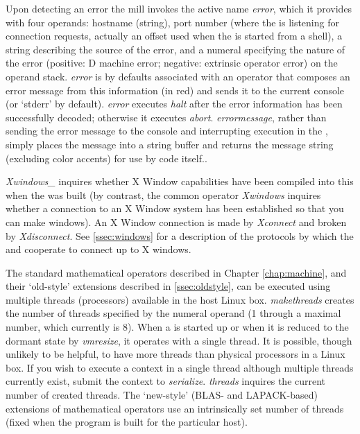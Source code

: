 Upon detecting an error the  mill invokes the active name \emph{error}, which it provides with four operands: hostname (string), port number (where the  is listening for connection requests, actually an offset used when the  is started from a shell), a string describing the source of the error, and a numeral specifying the nature of the error (positive: D machine error; negative: extrinsic operator error) on the operand stack. \emph{error} is by defaults associated with an operator that composes an error message from this information (in red) and sends it to the current console (or `stderr' by default). \emph{error} executes \emph{halt} after the error information has been successfully decoded; otherwise it executes \emph{abort}. \emph{errormessage}, rather than sending the error message to the console and interrupting execution in the , simply places the message into a string buffer and returns the message string (excluding color accents) for use by  code itself..

\emph{Xwindows\_} inquires whether X Window capabilities have been compiled into this  when the  was built (by contrast, the common operator \emph{Xwindows} inquires whether a connection to an X Window system has been established so that you can make windows). An X Window connection is made by \emph{Xconnect} and broken by \emph{Xdisconnect}. See \ref{ssec:windows} for a description of the protocols by which the  and  cooperate to connect up to X windows.

The standard mathematical operators described in Chapter \ref{chap:machine}, and their `old-style' extensions described in \ref{ssec:oldstyle}, can be executed using multiple threads (processors) available in the host Linux box. \emph{makethreads} creates the number of threads specified by the numeral operand (1 through a maximal number, which currently is 8). When a  is started up or when it is reduced to the dormant state by \emph{vmresize}, it operates with a single thread. It is possible, though unlikely to be helpful, to have more threads than physical processors in a Linux box. If you wish to execute a context in a single thread although multiple threads currently exist, submit the context to \emph{serialize}. \emph{threads} inquires the current number of created threads. The `new-style' (BLAS- and LAPACK-based) extensions of mathematical operators use an intrinsically set number of threads (fixed when the  program is built for the particular host).

